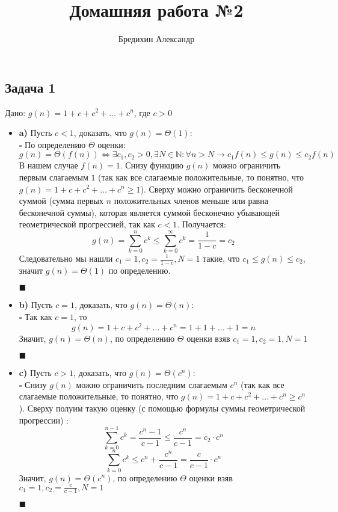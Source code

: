 \documentclass[a4paper,12pt]{article} %
\author{Бредихин Александр}
\title{Домашняя работа №2}
\begin{document}

\maketitle

\subsection*{Задача 1}
Дано: $ g(n) = 1 + c + c^2 + \ldots + c^n $, где $ c > 0 $
\begin{itemize}
\item \textbf{a)} Пусть $ c < 1 $, доказать, что $ g(n) = \Theta(1) $:\\
$\square$ По определению $ \Theta $ оценки:\\
$$ g(n) = \Theta(f(n)) \Leftrightarrow \exists c_1,c_2>0, \exists N \in \mathbb{N}: \forall n>N \longrightarrow 
c_1f(n) \leqslant g(n) \leqslant c_2f(n)$$
В нашем случае $ f(n) = 1 $. Снизу функцию $ g(n) $ можно ограничить первым слагаемым $ 1 $ (так как все слагаемые положительные, то понятно, что $ g(n) = 1 + c + c^2 + \ldots + c^n \geqslant 1 $). Сверху можно ограничить бесконечной суммой (сумма первых $ n $ положительных членов меньше или равна бесконечной суммы), которая является суммой бесконечно убывающей геометрической прогрессией, так как $ c < 1 $. Получается:
$$ g(n)=\sum_{k=0}^{n} c^{k} \leq \sum_{k=0}^{\infty} c^{k}=\frac{1}{1-c}=c_{2} $$
Следовательно мы нашли $ c_{1} = 1, c_2 = \frac{1}{1-c}, N = 1 $ такие, что $c_1 \leqslant g(n) \leqslant c_2  $, значит $ g(n) = \Theta(1) $ по определению.
\begin{flushright}
	$\blacksquare$
\end{flushright}

\item \textbf{b)} Пусть $ c = 1 $, доказать, что $ g(n) = \Theta(n) $:\\
$\square$ Так как $ c = 1 $, то 
$$ g(n) = 1 + c + c^2 + \ldots + c^n = 1 + 1 +\ldots + 1 = n $$
Значит, $ g(n) = \Theta(n) $, по определению $ \Theta $ оценки взяв $  c_{1} = 1, c_2 = 1, N = 1 $
\begin{flushright}
	$\blacksquare$
\end{flushright}

\item \textbf{c)} Пусть $ c > 1 $, доказать, что $ g(n) = \Theta(c^n) $:\\
$\square$ Снизу $ g(n) $ можно ограничить последним слагаемым $ c^n $ (так как все слагаемые положительные, то понятно, что $ g(n) = 1 + c + c^2 + \ldots + c^n \geqslant c^n $). Сверху полуим такую оценку (с помощью формулы суммы геометрической прогрессии) :
$$
\sum_{k=0}^{n-1} c^{k}=\frac{c^{n}-1}{c-1} \leq \frac{c^{n}}{c-1}=c_{2} \cdot c^{n}
$$
$$
\sum_{k=0}^{n} c^{k} \leq c^{n}+\frac{c^{n}}{c-1}=\frac{c}{c-1} \cdot c^{n}
$$
Значит, $ g(n) = \Theta(c^n) $, по определению $ \Theta $ оценки взяв $  c_{1} = 1, c_2 = \frac{c}{c - 1}, N = 1 $
\begin{flushright}
	$\blacksquare$
\end{flushright}

\end{itemize}
\end{document}
